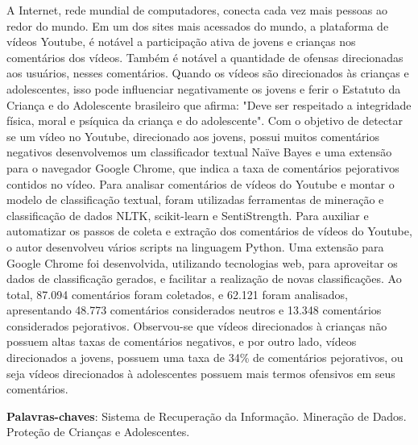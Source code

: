 

\setlength{\absparsep}{18pt} %

\begin{resumo}
 A Internet, rede mundial de computadores, conecta cada vez mais pessoas ao redor do mundo. Em um dos sites mais acessados do mundo, a plataforma de vídeos Youtube, é notável a participação ativa de jovens e crianças nos comentários dos vídeos. Também é notável a quantidade de ofensas direcionadas aos usuários, nesses comentários. Quando os vídeos são direcionados às crianças e adolescentes, isso pode influenciar negativamente os jovens e ferir o Estatuto da Criança e do Adolescente brasileiro que afirma: "Deve ser respeitado a integridade física, moral e psíquica da criança e do adolescente". 
 Com o objetivo de detectar se um vídeo no Youtube, direcionado aos jovens, possui muitos comentários negativos desenvolvemos um classificador textual Naïve Bayes e uma extensão para o navegador Google Chrome, que indica a taxa de comentários pejorativos contidos no vídeo.
 Para analisar comentários de vídeos do Youtube e montar o modelo de classificação textual, foram utilizadas ferramentas de mineração e classificação de dados NLTK, scikit-learn e SentiStrength. Para auxiliar e automatizar os passos de coleta e extração dos comentários de vídeos do Youtube, o autor desenvolveu vários scripts na linguagem Python. Uma extensão para Google Chrome foi desenvolvida, utilizando tecnologias web, para aproveitar os dados de classificação gerados, e facilitar a realização de novas classificações.
 Ao total, 87.094 comentários foram coletados, e 62.121 foram analisados, apresentando 48.773 comentários considerados neutros e 13.348 comentários considerados pejorativos.
 Observou-se que vídeos direcionados à crianças não possuem altas taxas de comentários negativos, e por outro lado, vídeos direcionados a jovens, possuem uma taxa de 34\% de comentários pejorativos, ou seja vídeos direcionados à adolescentes possuem mais termos ofensivos em seus comentários.
 

 \textbf{Palavras-chaves}: Sistema de Recuperação da Informação. Mineração de Dados. Proteção de Crianças e Adolescentes.
\end{resumo}

